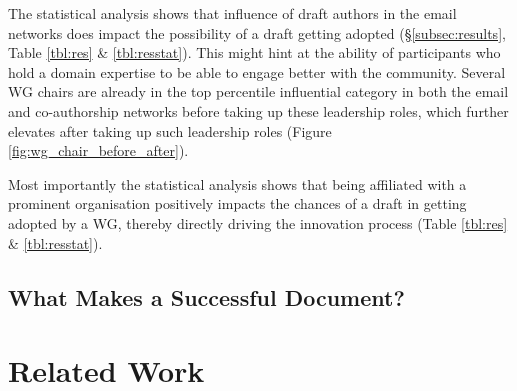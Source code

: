 \documentclass[twocolumn,10pt]{article}
\begin{document}
The statistical analysis shows that influence of draft authors in the email
networks does impact the possibility of a draft getting adopted
(\S\ref{subsec:results}, Table \ref{tbl:res} \& \ref{tbl:resstat}). This
might hint at the ability of participants who hold a domain expertise to be
able to engage better with the community. Several WG chairs are already in
the top percentile influential category in both the email and co-authorship
networks before taking up these leadership roles, which further elevates
after taking up such leadership roles (Figure
\ref{fig:wg_chair_before_after}).

Most importantly the statistical analysis shows that being affiliated with
a prominent organisation positively impacts the chances of a draft in
getting adopted by a WG, thereby directly driving the innovation process
(Table \ref{tbl:res} \& \ref{tbl:resstat}).

\subsection{What Makes a Successful Document?}


\section{Related Work}
\label{sec:related}

%
%



\end{document}
